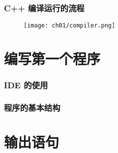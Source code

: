 \begin{frame}[fragile]
    \frametitle{C++ 编译运行的流程}

    \begin{figure}
        \texttt{[image: ch01/compiler.png]}
    \end{figure}
\end{frame}


\section{编写第一个程序}

\begin{frame}[fragile]
    \frametitle{IDE 的使用}

\end{frame}

\begin{frame}[fragile]
    \frametitle{程序的基本结构}

     {
        
    }{
        
    }
\end{frame}


\section{输出语句}

